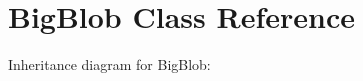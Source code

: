 \hypertarget{classBigBlob}{}\section{Big\+Blob Class Reference}
\label{classBigBlob}


Inheritance diagram for Big\+Blob\+:
